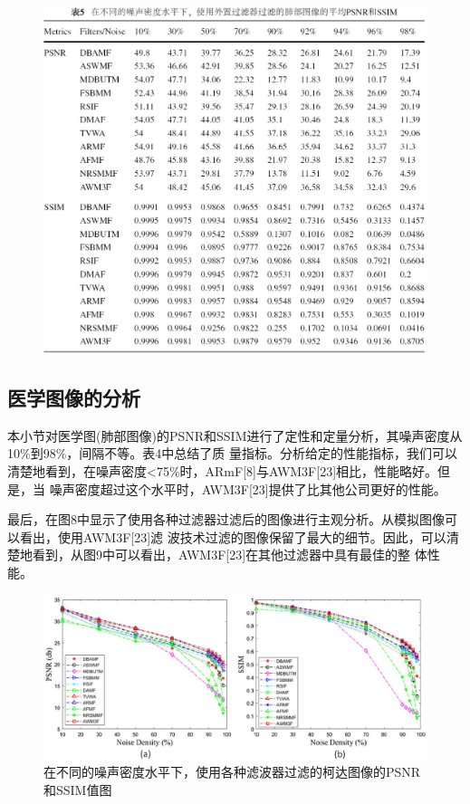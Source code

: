 \documentclass[12pt]{article} %
\begin{document}
\begin{figure}[H]
    \centering
    \includegraphics[width=1\textwidth]{images/13.eps}
\end{figure}

\vspace{1em}

\subsection{医学图像的分析}
本小节对医学图(肺部图像)的PSNR和SSIM进行了定性和定量分析，其噪声密度从10\%到98\%，间隔不等。表4中总结了质
量指标。分析给定的性能指标，我们可以清楚地看到，在噪声密度<75\%时，ARmF[8]与AWM3F[23]相比，性能略好。但是，当
噪声密度超过这个水平时，AWM3F[23]提供了比其他公司更好的性能。

\hspace{2em}最后，在图8中显示了使用各种过滤器过滤后的图像进行主观分析。从模拟图像可以看出，使用AWM3F[23]滤
波技术过滤的图像保留了最大的细节。因此，可以清楚地看到，从图9中可以看出，AWM3F[23]在其他过滤器中具有最佳的整
体性能。

\begin{figure}[H]
    \centering
    \includegraphics[width=1\textwidth]{images/14.eps}
    \caption{在不同的噪声密度水平下，使用各种滤波器过滤的柯达图像的PSNR和SSIM值图}
\end{figure}
\end{document}
